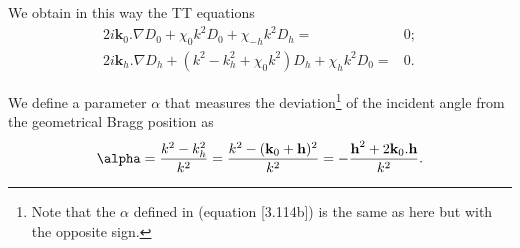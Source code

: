 \documentclass[preprint]{iucr}              %
\begin{document}

We obtain in this way the TT equations 
\begin{subequations}
\label{eq:TTvector}
\begin{align}
2 i \textbf{k}_0 . \nabla D_0 + \chi_0 k^2 D_0 + \chi_{-h} k^2 D_h =& 0; \\
2 i \textbf{k}_h . \nabla D_h + (k^2 - k_h^2 + \chi_0 k^2) D_h + \chi_{h} k^2 D_0 =& 0.
\end{align}
\end{subequations}

We define a parameter $\alpha$ that measures the deviation\footnote{
Note that the $\alpha$ defined in \cite{ZachariasenBook} (equation [3.114b]) is the same as here but with the opposite sign.
}
of the incident angle from the geometrical Bragg position as
\begin{equation}
\label{eq:alpha}
\alpha = \frac{k^2-k_h^2}{k^2} = \frac{k^2-(\textbf k_0 + \textbf h)^2}{k^2} = - \frac{\textbf h^2 + 2 \textbf k_0 . \textbf h}{k^2}.
\end{equation}
\end{document}

